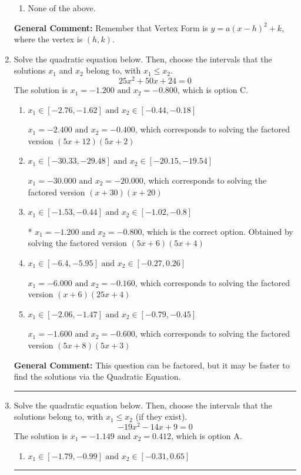 \documentclass{extbook}[14pt]
\newcommand{\litem}[1]{\item #1

\rule{\textwidth}{0.4pt}}
\begin{document}
\begin{enumerate}
{\begin{enumerate}[label=\Alph*.]
\begin{multicols}{2}
\end{multicols}\item None of the above.\end{enumerate}
\textbf{General Comment:} Remember that Vertex Form is $y = a(x-h)^2+k$, where the vertex is $(h, k)$.
}
\litem{
Solve the quadratic equation below. Then, choose the intervals that the solutions $x_1$ and $x_2$ belong to, with $x_1 \leq x_2$.
\[ 25x^{2} +50 x + 24 = 0 \]The solution is \( x_1 = -1.200 \text{ and } x_2 = -0.800 \), which is option C.\begin{enumerate}[label=\Alph*.]
\item \( x_1 \in [-2.76, -1.62] \text{ and } x_2 \in [-0.44, -0.18] \)

$x_1 = -2.400 \text{ and } x_2 = -0.400$, which corresponds to solving the factored version $(5x + 12)(5x + 2)$
\item \( x_1 \in [-30.33, -29.48] \text{ and } x_2 \in [-20.15, -19.54] \)

$x_1 = -30.000 \text{ and } x_2 = -20.000$, which corresponds to solving the factored version $(x + 30)(x + 20)$
\item \( x_1 \in [-1.53, -0.44] \text{ and } x_2 \in [-1.02, -0.8] \)

* $x_1 = -1.200 \text{ and } x_2 = -0.800$, which is the correct option. Obtained by solving the factored version $(5x + 6)(5x + 4)$
\item \( x_1 \in [-6.4, -5.95] \text{ and } x_2 \in [-0.27, 0.26] \)

$x_1 = -6.000 \text{ and } x_2 = -0.160$, which corresponds to solving the factored version $(x + 6)(25x + 4)$
\item \( x_1 \in [-2.06, -1.47] \text{ and } x_2 \in [-0.79, -0.45] \)

$x_1 = -1.600 \text{ and } x_2 = -0.600$, which corresponds to solving the factored version $(5x + 8)(5x + 3)$
\end{enumerate}

\textbf{General Comment:} This question can be factored, but it may be faster to find the solutions via the Quadratic Equation.
}
\litem{
Solve the quadratic equation below. Then, choose the intervals that the solutions belong to, with $x_1 \leq x_2$ (if they exist).
\[ -19x^{2} -14 x + 9 = 0 \]The solution is \( x_1 = -1.149 \text{ and } x_2 = 0.412 \), which is option A.\begin{enumerate}[label=\Alph*.]
\item \( x_1 \in [-1.79, -0.99] \text{ and } x_2 \in [-0.31, 0.65] \)


\end{enumerate}}
\end{enumerate}
\end{document}

